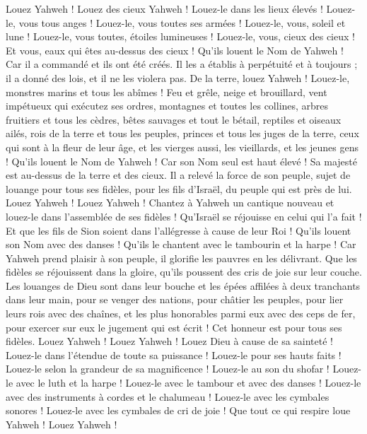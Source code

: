 \begin{multicols}{2}
\VerseOne{}Louez Yahweh ! Louez des cieux Yahweh ! Louez-le dans les lieux élevés !
Louez-le, vous tous anges ! Louez-le, vous toutes ses armées !
Louez-le, vous, soleil et lune ! Louez-le, vous toutes, étoiles lumineuses !
Louez-le, vous, cieux des cieux ! Et vous, eaux qui êtes au-dessus des cieux !
Qu'ils louent le Nom de Yahweh ! Car il a commandé et ils ont été créés.
Il les a établis à perpétuité et à toujours ; il a donné des lois, et il ne les violera pas.
De la terre, louez Yahweh ! Louez-le, monstres marins et tous les abîmes !
Feu et grêle, neige et brouillard, vent impétueux qui exécutez ses ordres,
montagnes et toutes les collines, arbres fruitiers et tous les cèdres,
bêtes sauvages et tout le bétail, reptiles et oiseaux ailés,
rois de la terre et tous les peuples, princes et tous les juges de la terre,
ceux qui sont à la fleur de leur âge, et les vierges aussi, les vieillards, et les jeunes gens !
Qu'ils louent le Nom de Yahweh ! Car son Nom seul est haut élevé ! Sa majesté est au-dessus de la terre et des cieux.
Il a relevé la force de son peuple, sujet de louange pour tous ses fidèles, pour les fils d'Israël, du peuple qui est près de lui. Louez Yahweh !
\VerseOne{}Louez Yahweh ! Chantez à Yahweh un cantique nouveau et louez-le dans l'assemblée de ses fidèles !
Qu'Israël se réjouisse en celui qui l'a fait ! Et que les fils de Sion soient dans l'allégresse à cause de leur Roi !
Qu'ils louent son Nom avec des danses ! Qu'ils le chantent avec le tambourin et la harpe !
Car Yahweh prend plaisir à son peuple, il glorifie les pauvres en les délivrant.
Que les fidèles se réjouissent dans la gloire, qu'ils poussent des cris de joie sur leur couche.
Les louanges de Dieu sont dans leur bouche et les épées affilées à deux tranchants dans leur main,
pour se venger des nations, pour châtier les peuples,
pour lier leurs rois avec des chaînes, et les plus honorables parmi eux avec des ceps de fer,
pour exercer sur eux le jugement qui est écrit ! Cet honneur est pour tous ses fidèles. Louez Yahweh !
\VerseOne{}Louez Yahweh ! Louez Dieu à cause de sa sainteté ! Louez-le dans l'étendue de toute sa puissance !
Louez-le pour ses hauts faits ! Louez-le selon la grandeur de sa magnificence !
Louez-le au son du shofar ! Louez-le avec le luth et la harpe !
Louez-le avec le tambour et avec des danses ! Louez-le avec des instruments à cordes et le chalumeau !
Louez-le avec les cymbales sonores ! Louez-le avec les cymbales de cri de joie !
Que tout ce qui respire loue Yahweh ! Louez Yahweh !
\PPE{}
\end{multicols}
